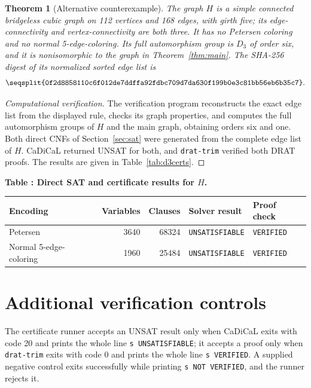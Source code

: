 \documentclass[11pt]{article}
\newtheorem{theorem}{Theorem}[section]
\newcommand{\sha}[1]{\texttt{\seqsplit{#1}}}
\newcommand{\code}[1]{\texttt{#1}}
\begin{document}
\begin{theorem}[Alternative counterexample]\label{thm:d3}
The graph \(H\) is a simple connected bridgeless cubic graph on 112 vertices
and 168 edges, with girth five; its edge-connectivity and vertex-connectivity
are both three.  It has no
Petersen coloring and no normal 5-edge-coloring.  Its full automorphism
group is \(D_3\) of order six, and it is nonisomorphic to the graph in
Theorem~\ref{thm:main}.  The SHA-256 digest of its normalized sorted edge list is
\[
\sha{0f2d8858110c6f012de7ddffa92fdbc709d7da630f199b0e3c81bb56eb6b35c7}.
\]
\end{theorem}

\begin{proof}[Computational verification]\leavevmode\par\noindent
The verification program reconstructs the exact edge list from the displayed
rule, checks its graph properties, and computes the full automorphism groups
of \(H\) and the main graph, obtaining orders six and one.  Both direct CNFs of
Section~\ref{sec:sat} were generated from the complete edge list of \(H\).
CaDiCaL returned UNSAT for both, and \texttt{drat-trim} verified both DRAT
proofs.  The results are given in Table~\ref{tab:d3certs}.
\end{proof}

\begin{center}
\label{tab:d3certs}
\textbf{Table \thetable: Direct SAT and certificate results for \(H\).}\par\smallskip
\footnotesize
\begin{tabular}{@{}lrrll@{}}
\toprule
Encoding & Variables & Clauses & Solver result & Proof check\\
\midrule
Petersen & 3640 & 68324 & \code{UNSATISFIABLE} & \code{VERIFIED}\\
Normal 5-edge-coloring & 1960 & 25484 & \code{UNSATISFIABLE} & \code{VERIFIED}\\
\bottomrule
\end{tabular}
\end{center}

\section{Additional verification controls}\label{sec:audit}

The certificate runner accepts an UNSAT result only when CaDiCaL exits with
code 20 and prints the whole line \code{s UNSATISFIABLE}; it accepts a proof
only when \texttt{drat-trim} exits with code 0 and prints the whole line
\code{s VERIFIED}.  A supplied negative control exits successfully while
printing \code{s NOT VERIFIED}, and the runner rejects it.
\end{document}
